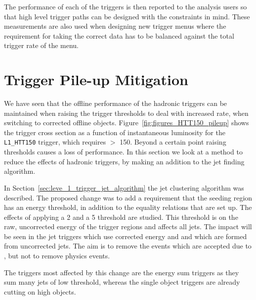 The performance of each of the \Lone triggers is then reported to the analysis 
users so that high level trigger paths can be designed with the \Lone 
constraints in mind. These measurements are also used when designing new \Lone 
trigger menus where the requirement for taking the correct data has to be 
balanced against the total trigger rate of the \Lone menu.

\section{\Lone Trigger Pile-up Mitigation} %
\label{sub:lone_trigger_pile_up_mitigation}


We have seen that the offline performance of the \Lone hadronic triggers 
can be maintained when raising the trigger thresholds to deal with increased 
rate, when switching to \pu corrected offline objects. 
Figure~\ref{fig:figures_HTT150_pileup} shows the trigger cross section as a 
function of instantaneous luminosity for the \verb|L1_HTT150| trigger, which 
requires \HT $>$ \unit{150}{\GeV}. Beyond a certain point raising 
thresholds causes a loss of performance.
In this section we look at a method to reduce the effects of \pu hadronic 
\Lone triggers, by making an addition to the \Lone jet finding algorithm.

In Section~\ref{sec:leve_1_trigger_jet_algorithm} the \Lone jet clustering 
algorithm was described. The proposed change was to add a requirement that the 
seeding region has an energy threshold, in addition to the equality 
relations that are set up. The effects of applying a \unit{2}{\GeV} and a 
\unit{5}{\GeV} threshold are studied. This threshold is on the raw, uncorrected 
energy of the trigger regions and affects all \Lone jets. The impact will be 
seen in the \Lone jet triggers which use corrected energy and \Lone \HT and 
\HTm which are formed from uncorrected jets.
The aim is to remove the events which are accepted due to \pu, but not to 
remove physics events.

The triggers most affected by this change are the energy sum triggers as they 
sum many jets of low threshold, whereas the single object triggers are already 
cutting on high \ET objects.

